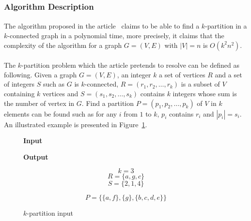 \subsubsection{Algorithm Description}
\paragraph{}
The algorithm proposed in the article~\cite{JS94} claims to be able to find
a $k$-partition in a $k$-connected graph in a polynomial time, more precisely,
it claims that the complexity of the algorithm for a graph $G = (V,E)$ with
$|V| = n$ is $O(k^2 n^2)$.

\paragraph{}
The $k$-partition problem which the article pretends to resolve can be
defined as following. Given a graph $G = (V,E)$, an integer $k$ a set
of vertices $R$ and a set of integers $S$ such as $G$ is $k$-connected,
$R = (r_1, r_2, \dots, r_k )$ is a subset of $V$ containing $k$ vertices and
$S = (s_1, s_2, \dots, s_k )$ contains $k$ integers whose sum is the number of
vertex in $G$. Find a partition $P = (p_1, p_2, \dots, p_k)$ of $V$ in $k$
elements can be found such as for any $i$ from $1$ to $k$, $p_i$ contains
$r_i$ and $|p_i| = s_i$. An illustrated example is presented in
Figure~\ref{fig:inputOutput}.

\newcommand{\formalTitle}[1]{\textbf{\large #1}}

\begin{figure}[H]
  \caption{\label{fig:inputOutput}$k$-partition input}
  \begin{minipage}{.5\textwidth}
    \begin{center}
      \formalTitle{Input}\\
      \begin{tikzpicture}[x=.06\textwidth, y=.06\textwidth,transform shape]
        
      \end{tikzpicture}
    \end{center}
  \end{minipage}
  \begin{minipage}{.5\textwidth}
    \begin{center}
      \formalTitle{Output}\\
      \begin{tikzpicture}[x=.06\textwidth, y=.06\textwidth,transform shape]
        
      \end{tikzpicture}
    \end{center}
  \end{minipage}
  \begin{minipage}{.5\textwidth}
    $$k = 3$$
    $$R = \{a,g,c\}$$
    $$S = \{2,1,4\}$$
  \end{minipage}
  \begin{minipage}{.5\textwidth}
    $$P = \big\{\{a, f\},\{g\},\{b, c, d, e\}\big\}$$
  \end{minipage}
\end{figure}

